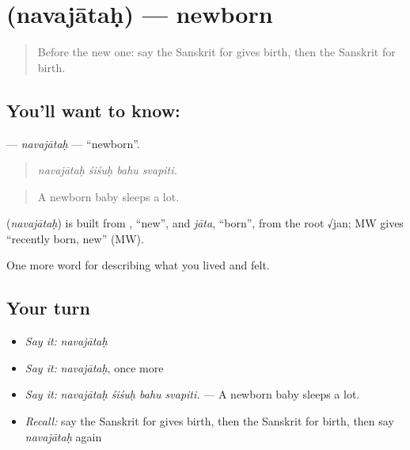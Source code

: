 \section[\texorpdfstring{\sk{नवजातः} (navajātaḥ)}{नवजातः (navajātaḥ)}]{ (navajātaḥ) — newborn}

\label{lesson:SA-C492-navajatah}



\begin{quote}
Before the new one: say the Sanskrit for gives birth, then the Sanskrit for birth.
\end{quote}

\subsection*{You'll want to know: }
\textbf{} — \emph{navajātaḥ} — \textquotedblleft{}newborn\textquotedblright{}.

\begin{quote}
   
\end{quote}

\begin{quote}
\emph{navajātaḥ śiśuḥ bahu svapiti.}
\end{quote}

\begin{quote}
A newborn baby sleeps a lot.
\end{quote}

\begin{cousinweb}
\textbf{} (\emph{navajātaḥ}) is built from \textbf{}, \textquotedblleft{}new\textquotedblright{}, and \emph{jāta}, \textquotedblleft{}born\textquotedblright{}, from the root √jan; MW gives \textquotedblleft{}recently born, new\textquotedblright{} (MW).
\end{cousinweb}

\begin{grammarlens}[title={What you've built}]
One more word for describing what you lived and felt.
\end{grammarlens}

\subsection*{Your turn}
\begin{itemize}
\raggedright
  \item \emph{Say it:} \emph{navajātaḥ}
  \item \emph{Say it:} \emph{navajātaḥ}, once more
  \item \emph{Say it:} \emph{navajātaḥ śiśuḥ bahu svapiti.} — A newborn baby sleeps a lot.
  \item \emph{Recall:} say the Sanskrit for gives birth, then the Sanskrit for birth, then say \emph{navajātaḥ} again
\end{itemize}

